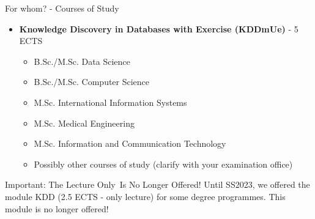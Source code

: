 \begin{frame}{For whom? - Courses of Study}
	\begin{itemize}
		\item \textbf{Knowledge Discovery in Databases with Exercise (KDDmUe)} - 5 ECTS
		      \begin{itemize}
			      \item B.Sc./M.Sc. Data Science
			      \item B.Sc./M.Sc. Computer Science
			      \item M.Sc. International Information Systems
			      \item M.Sc. Medical Engineering
			      \item M.Sc. Information and Communication Technology
			      \item {\color{gray} Possibly other courses of study (clarify with your examination office)}
		      \end{itemize}
	\end{itemize}

	\begin{alertblock}{Important: The \glqq Lecture Only\grqq\ Is No Longer Offered!}
		Until SS2023, we offered the module KDD (2.5 ECTS - only lecture) for some degree programmes. This module is no longer offered!
	\end{alertblock}

\end{frame}

